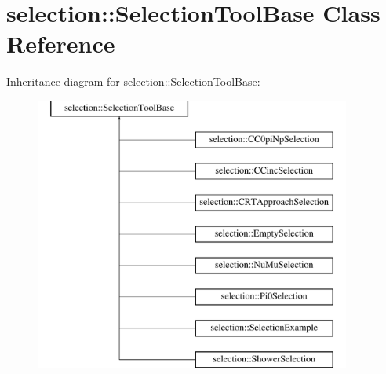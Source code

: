 \hypertarget{classselection_1_1SelectionToolBase}{\section{selection\-:\-:Selection\-Tool\-Base Class Reference}
\label{classselection_1_1SelectionToolBase}
}
Inheritance diagram for selection\-:\-:Selection\-Tool\-Base\-:\begin{figure}[H]
\begin{center}
\leavevmode
\includegraphics[height=9.000000cm]{classselection_1_1SelectionToolBase}
\end{center}
\end{figure}

